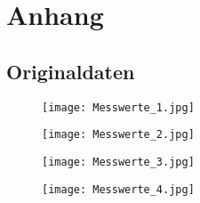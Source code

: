 \section{Anhang}
\label{sec:Anhang}
\subsection{Originaldaten}
\begin{figure}[H]
  \centering
  \texttt{[image: Messwerte\_1.jpg]}
  \label{fig:Messungen_1}
\end{figure}

\begin{figure}[H]
  \centering
  \texttt{[image: Messwerte\_2.jpg]}
  \label{fig:Messungen_2}
\end{figure}

\begin{figure}[H]
  \centering
  \texttt{[image: Messwerte\_3.jpg]}
  \label{fig:Messungen_3}
\end{figure}
\begin{figure}[H]
    \centering
    \texttt{[image: Messwerte\_4.jpg]}
    \label{fig:Messungen_4}
\end{figure}
